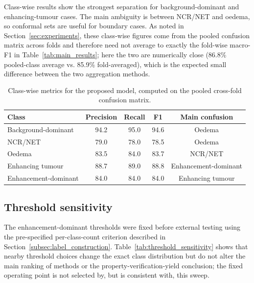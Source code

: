 \documentclass[preprint,11pt]{elsarticle}
\begin{document}
Class-wise results show the strongest separation for background-dominant and enhancing-tumour cases. The main ambiguity is between NCR/NET and oedema, so conformal sets are useful for boundary cases. As noted in Section~\ref{sec:experiments}, these class-wise figures come from the pooled confusion matrix across folds and therefore need not average to exactly the fold-wise macro-F1 in Table~\ref{tab:main_results}; here the two are numerically close (86.8\% pooled-class average vs. 85.9\% fold-averaged), which is the expected small difference between the two aggregation methods.

\begin{table}[H]
\centering
\caption{Class-wise metrics for the proposed model, computed on the pooled cross-fold confusion matrix.}
\label{tab:classwise}
\scriptsize
\begin{tabular}{lcccc}
\toprule
\textbf{Class} & \textbf{Precision} & \textbf{Recall} & \textbf{F1} & \textbf{Main confusion} \\
\midrule
Background-dominant & 94.2 & 95.0 & 94.6 & Oedema \\
NCR/NET & 79.0 & 78.0 & 78.5 & Oedema \\
Oedema & 83.5 & 84.0 & 83.7 & NCR/NET \\
Enhancing tumour & 88.7 & 89.0 & 88.8 & Enhancement-dominant \\
Enhancement-dominant & 84.0 & 84.0 & 84.0 & Enhancing tumour \\
\bottomrule
\end{tabular}
\end{table}

\subsection{Threshold sensitivity}
\label{subsec:threshold_sensitivity}

The enhancement-dominant thresholds were fixed before external testing using the pre-specified per-class-count criterion described in Section~\ref{subsec:label_construction}. Table~\ref{tab:threshold_sensitivity} shows that nearby threshold choices change the exact class distribution but do not alter the main ranking of methods or the property-verification-yield conclusion; the fixed operating point is not selected by, but is consistent with, this sweep.
\end{document}
